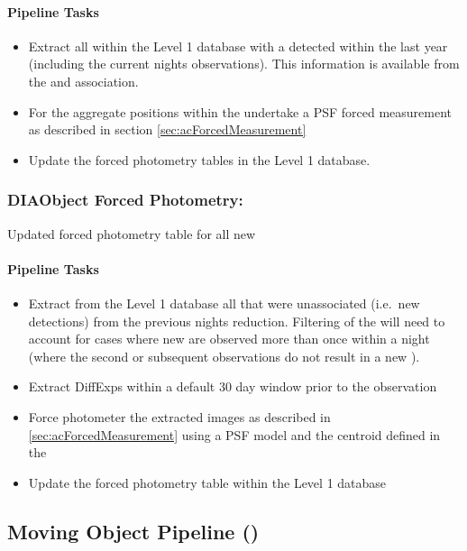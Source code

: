 \paragraph{Pipeline Tasks}

\begin{itemize}
\item Extract all \DIAObjects within the Level 1 database with a detected \DIASource within the last year (including the current nights observations). This information is available from the \DIASource and \DIAObject association.
\item For the aggregate positions within the \DIAObject undertake a PSF forced measurement as described in section \ref{sec:acForcedMeasurement}
\item Update the forced photometry tables in the Level 1 database.
\end{itemize}



\subsubsection{DIAObject Forced Photometry:}

Updated forced photometry table for all new \DIAObjects


\paragraph{Pipeline Tasks}

\begin{itemize}
\item Extract from the Level 1 database all \DIAObjects that were unassociated (i.e.\ new \DIASource detections) from the previous nights reduction. Filtering of the \DIAObjects will need to account for cases where new \DIASources are observed more than once within a night (where the second or subsequent observations do not result in a new \DIAObject).
\item Extract DiffExps within a  default 30 day window prior to the observation
\item Force photometer the extracted images as described in \ref{sec:acForcedMeasurement} using a PSF model and the centroid defined in the \DIAObject
\item Update the forced photometry table within the Level 1 database
\end{itemize}
\clearpage



\subsection{Moving Object Pipeline (\wbsMOPS)}
\label{sec:apMovingObjectPipeline}


